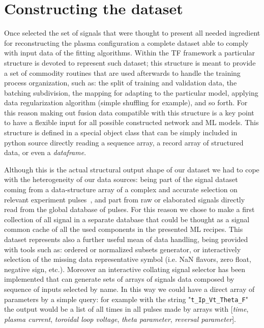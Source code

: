 \section{Constructing the dataset} %

Once selected the set of signals that were thought to present all needed ingredient for reconstructing the plasma configuration a complete dataset able to comply with \Tensorflow input data of the fitting algorithms. Within the \acs{TF} framework a particular structure is devoted to represent such dataset; this structure is meant to provide a set of commodity routines that are used afterwards to handle the training process organization, such as: the split of training and validation data, the batching subdivision, the mapping for adapting to the particular model, applying data regularization algorithm (simple shuffling for example), and so forth.
For this reason making out fusion data compatible with this structure is a key point to have a flexible input for all possible constructed network and ML models. 
This structure is defined in a special \TF object class that can be simply included in python source directly reading a sequence array, a record array of structured data, or even a \Pandas \textit{dataframe}.

Although this is the actual structural output shape of our dataset we had to cope with the heterogeneity of our data sources: being part of the signal dataset coming from a \IDL data-structure array of a complex and accurate selection on relevant experiment pulses~\cite{Gobbin}, and part from raw or elaborated signals directly read from the global \MDSplus database of pulses.
For this reason we chose to make a first collection of all signal in a separate database that could be thought as a signal common cache of all the used components in the presented ML recipes.
This dataset represents also a further useful mean of data handling, being provided with tools such as: ordered or normalized subsets generator, or interactively selection of the missing data representative symbol (i.e. NaN flavors, zero float, negative sign, etc.).
Moreover an interactive collating signal selector has been implemented that can generate sets of arrays of signals data composed by sequence of inputs selected by name. In this way we could have a direct array of parameters by a simple query: for example with the string "\texttt{t\_Ip\_Vt\_Theta\_F}" the output would be a list of all times in all pulses made by arrays with [\textit{time}, \textit{plasma current}, \textit{toroidal loop voltage}, \textit{theta parameter}, \textit{reversal parameter}].

